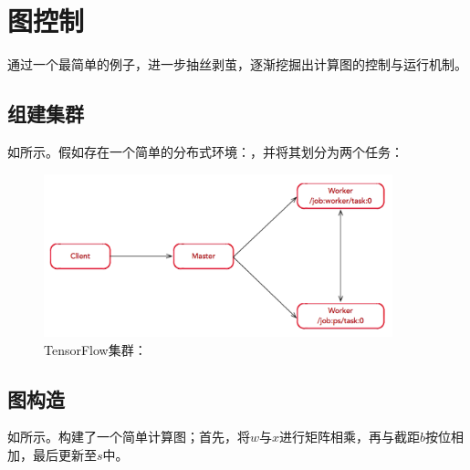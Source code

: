 \section{图控制}

\begin{content}

通过一个最简单的例子，进一步抽丝剥茧，逐渐挖掘出\tf{}计算图的控制与运行机制。

\subsection{组建集群}

如所示。假如存在一个简单的分布式环境：，并将其划分为两个任务：

\begin{enum}
\end{enum}

\begin{figure}[!htbp]
\centering
\includegraphics[width=0.9\textwidth]{figures/tf-1ps-1worker.png}
\caption{TensorFlow集群：}
 \label{fig:tf-1ps-1worker}
\end{figure}

\subsection{图构造}

如所示。构建了一个简单计算图；首先，将$w$与$x$进行矩阵相乘，再与截距$b$按位相加，最后更新至$s$中。


\end{content}
